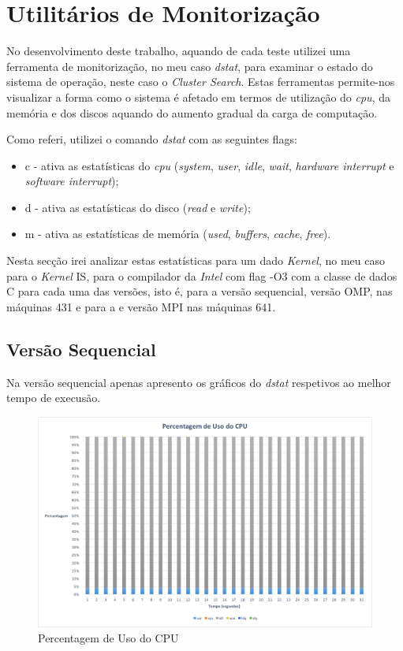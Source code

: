 \documentclass[conference,compsoc]{IEEEtran}
\begin{document}
\section{Utilitários de Monitorização}
No desenvolvimento deste trabalho, aquando de cada teste utilizei uma ferramenta de monitorização, no meu caso \textit{dstat}, para examinar o estado do sistema de operação, neste caso o \textit{Cluster Search}. Estas ferramentas permite-nos visualizar a forma como o sistema é afetado em termos de utilização do \textit{cpu}, da memória e dos discos aquando do aumento gradual da carga de computação.

Como referi, utilizei o comando \textit{dstat} com as seguintes flags:
\begin{itemize}
\item c - ativa as estatísticas do \textit{cpu} (\textit{system}, \textit{user}, \textit{idle}, \textit{wait}, \textit{hardware interrupt} e \textit{software interrupt});
\item d - ativa as estatísticas do disco (\textit{read} e \textit{write});
\item m - ativa as estatísticas de memória (\textit{used}, \textit{buffers}, \textit{cache}, \textit{free}).
\end{itemize}

Nesta secção irei analizar estas estatísticas para um dado \textit{Kernel}, no meu caso para o \textit{Kernel} IS, para o compilador da \textit{Intel} com flag -O3 com a classe de dados C para cada uma das versões, isto é, para a versão sequencial, versão OMP, nas máquinas 431 e para a e versão MPI nas máquinas 641.

\subsection{Versão Sequencial}
Na versão sequencial apenas apresento os gráficos do \textit{dstat} respetivos ao melhor tempo de execusão.

\begin{figure}[h!]
\centering
\includegraphics[scale=0.325]{dstat/SER/dstat_seq_cpu.png}
\caption{Percentagem de Uso do CPU}
\label{fig:dstat_seq_cpu}
\end{figure}
\end{document}
